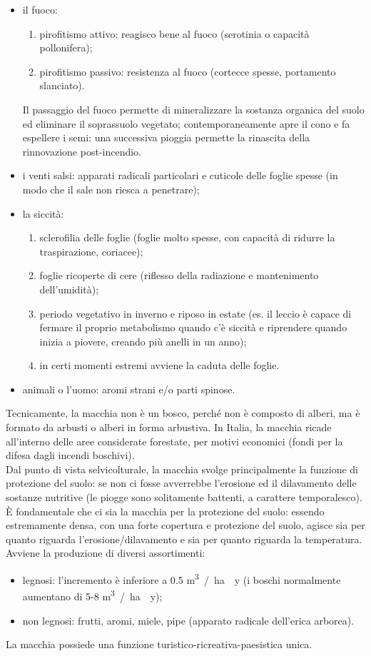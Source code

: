 \begin{itemize}[nosep]
    \item il fuoco:
    \begin{enumerate}[nosep]
        \item pirofitismo attivo: reagisco bene al fuoco (serotinia o capacità pollonifera);
        \item pirofitismo passivo: resistenza al fuoco (cortecce spesse, portamento slanciato).
    \end{enumerate}
    Il passaggio del fuoco permette di mineralizzare la sostanza organica del suolo ed eliminare il soprassuolo vegetato; contemporaneamente apre il cono e fa espellere i semi: una successiva pioggia permette la rinascita della rinnovazione post-incendio. 
    \item i venti salsi: apparati radicali particolari e cuticole delle foglie spesse (in modo che il sale non riesca a penetrare);
    \item la siccità: 
    \begin{enumerate}[nosep]
        \item sclerofilia delle foglie (foglie molto spesse, con capacità di ridurre la traspirazione, coriacee);
        \item foglie ricoperte di cere (riflesso della radiazione e mantenimento dell'umidità);
        \item periodo vegetativo in inverno e riposo in estate (es. il leccio è capace di fermare il proprio metabolismo quando c'è siccità e riprendere quando inizia a piovere, creando più anelli in un anno);
        \item in certi momenti estremi avviene la caduta delle foglie.
    \end{enumerate}
    \item animali o l'uomo: aromi strani e/o parti spinose.
\end{itemize}
Tecnicamente, la macchia non è un bosco, perché non è composto di alberi, ma è formato da arbusti o alberi in forma arbustiva. In Italia, la macchia ricade all'interno delle aree considerate forestate, per motivi economici (fondi per la difesa dagli incendi boschivi).\\
Dal punto di vista selvicolturale, la macchia svolge principalmente la funzione di protezione del suolo: se non ci fosse avverrebbe l'erosione ed il dilavamento delle sostanze nutritive (le piogge sono solitamente battenti, a carattere temporalesco). È fondamentale che ci sia la macchia per la protezione del suolo: essendo estremamente densa, con una forte copertura e protezione del suolo, agisce sia per quanto riguarda l'erosione/dilavamento e sia per quanto riguarda la temperatura.\\
Avviene la produzione di diversi assortimenti: 
\begin{itemize}[nosep]
    \item legnosi: l'incremento è inferiore a 0.5 \unit{m^3 / ha \cdot y} (i boschi normalmente aumentano di 5-8 \unit{m^3 / ha \cdot y});
    \item non legnosi: frutti, aromi, miele, pipe (apparato radicale dell'erica arborea). 
\end{itemize}
La macchia possiede una funzione turistico-ricreativa-paesistica unica.
